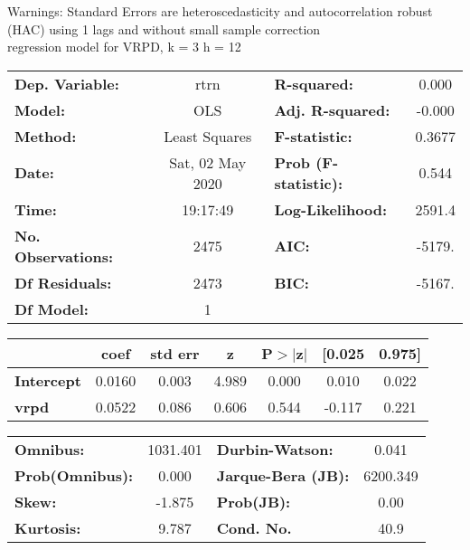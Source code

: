 Warnings: \newline
 [1] Standard Errors are heteroscedasticity and autocorrelation robust (HAC) using 1 lags and without small sample correction\\ 

regression model for VRPD, k = 3 h = 12\begin{center}
\begin{tabular}{lclc}
\toprule
\textbf{Dep. Variable:}    &       rtrn       & \textbf{  R-squared:         } &     0.000   \\
\textbf{Model:}            &       OLS        & \textbf{  Adj. R-squared:    } &    -0.000   \\
\textbf{Method:}           &  Least Squares   & \textbf{  F-statistic:       } &    0.3677   \\
\textbf{Date:}             & Sat, 02 May 2020 & \textbf{  Prob (F-statistic):} &    0.544    \\
\textbf{Time:}             &     19:17:49     & \textbf{  Log-Likelihood:    } &    2591.4   \\
\textbf{No. Observations:} &        2475      & \textbf{  AIC:               } &    -5179.   \\
\textbf{Df Residuals:}     &        2473      & \textbf{  BIC:               } &    -5167.   \\
\textbf{Df Model:}         &           1      & \textbf{                     } &             \\
\bottomrule
\end{tabular}
\begin{tabular}{lcccccc}
                   & \textbf{coef} & \textbf{std err} & \textbf{z} & \textbf{P$> |$z$|$} & \textbf{[0.025} & \textbf{0.975]}  \\
\midrule
\textbf{Intercept} &       0.0160  &        0.003     &     4.989  &         0.000        &        0.010    &        0.022     \\
\textbf{vrpd}      &       0.0522  &        0.086     &     0.606  &         0.544        &       -0.117    &        0.221     \\
\bottomrule
\end{tabular}
\begin{tabular}{lclc}
\textbf{Omnibus:}       & 1031.401 & \textbf{  Durbin-Watson:     } &    0.041  \\
\textbf{Prob(Omnibus):} &   0.000  & \textbf{  Jarque-Bera (JB):  } & 6200.349  \\
\textbf{Skew:}          &  -1.875  & \textbf{  Prob(JB):          } &     0.00  \\
\textbf{Kurtosis:}      &   9.787  & \textbf{  Cond. No.          } &     40.9  \\
\bottomrule
\end{tabular}
\end{center}

